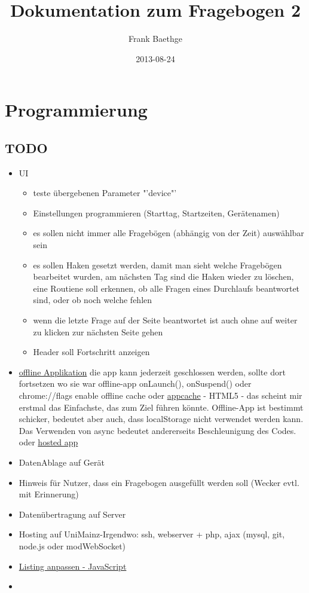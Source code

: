 \documentclass[a4paper]{scrartcl}
\title{Dokumentation zum Fragebogen 2}
\author{Frank Baethge}
\date{2013-08-24}
\begin{document}
	\section{Programmierung}

		\subsection{TODO}
			\begin{itemize}
				\item UI

					\begin{itemize}
						\item teste übergebenen Parameter "'device"'
						\item Einstellungen programmieren (Starttag, Startzeiten, Gerätenamen)
						\item es sollen nicht immer alle Fragebögen (abhängig von der Zeit) auswählbar sein
						\item es sollen Haken gesetzt werden, damit man sieht welche Fragebögen bearbeitet wurden, am nächsten Tag sind die Haken wieder zu löschen, eine Routiene soll erkennen, ob alle Fragen eines Durchlaufs beantwortet sind, oder ob noch welche fehlen
						\item wenn die letzte Frage auf der Seite beantwortet ist auch ohne auf weiter zu klicken zur nächsten Seite gehen
						\item Header soll Fortschritt anzeigen
					\end{itemize}
				\item \href{http://developer.chrome.com/apps}{offline Applikation}\newline
					die app kann jederzeit geschlossen werden, sollte dort fortsetzen wo sie war\newline
					offline-app onLaunch(), onSuspend()\newline
					oder chrome://flags enable offline cache\newline
					oder \href{http://appcachefacts.info/}{appcache} - HTML5 - das scheint mir erstmal das Einfachste, das zum Ziel führen könnte. Offline-App ist bestimmt schicker, bedeutet aber auch, dass localStorage nicht verwendet werden kann. Das Verwenden von async bedeutet andererseits Beschleunigung des Codes.
					oder \href{https://developers.google.com/chrome/apps/docs/developers_guide?csw=1}{hosted app}
				\item DatenAblage auf Gerät
				\item Hinweis für Nutzer, dass ein Fragebogen ausgefüllt werden soll (Wecker evtl. mit Erinnerung)
				\item Datenübertragung auf Server
				\item Hosting auf UniMainz-Irgendwo: ssh, webserver + php, ajax (mysql, git, node.js oder modWebSocket)
				\item \href{http://mirror.math.ku.edu/tex-archive/macros/latex/contrib/listings/listings.pdf}{Listing anpassen - JavaScript} 
				\item  
			\end{itemize}
\end{document}
